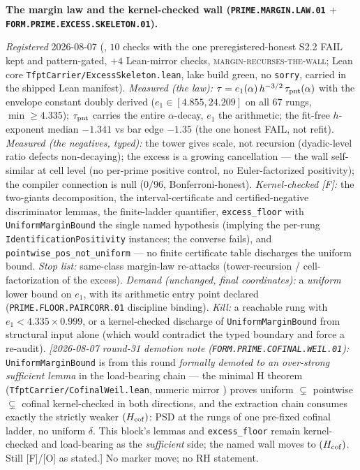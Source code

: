 \documentclass[11pt,a4paper]{article}
\begin{document}
\par\smallskip\noindent\textbf{The margin law and the
kernel-checked wall (\texttt{PRIME.MARGIN.LAW.01} $+$
\texttt{FORM.PRIME.\allowbreak EXCESS.\allowbreak SKELETON.01}).}
{\sloppy
\emph{Registered} 2026-08-07
(, $10$ checks with the
one preregistered-honest S2.2 FAIL kept and pattern-gated, $+4$
Lean-mirror checks, \textsc{margin-recurses-the-wall}; Lean core
\texttt{TfptCarrier/ExcessSkeleton.lean}, lake build green, no
\texttt{sorry}, carried in the shipped Lean manifest).
\emph{Measured (the law):} $\tau = e_1(\alpha)\, h^{-3/2}\,
\tau_{\rm pnt}(\alpha)$ with the envelope constant doubly
derived ($e_1 \in [4.855, 24.209]$ on all $67$ rungs,
$\min \ge 4.335$); $\tau_{\rm pnt}$ carries the entire
$\alpha$-decay, $e_1$ the arithmetic; the fit-free $h$-exponent
median $-1.341$ vs bar edge $-1.35$ (the one honest FAIL, not
refit).  \emph{Measured (the negatives, typed):} the tower gives
scale, not recursion (dyadic-level ratio defects non-decaying);
the excess is a growing cancellation --- the wall self-similar
at cell level (no per-prime positive control, no
Euler-factorized positivity); the compiler connection is null
($0/96$, Bonferroni-honest).  \emph{Kernel-checked [F]:} the
two-giants decomposition, the interval-certificate and
certified-negative discriminator lemmas, the finite-ladder
quantifier, \texttt{excess\_floor} with
\texttt{UniformMarginBound} the single named hypothesis
(implying the per-rung \texttt{IdentificationPositivity}
instances; the converse fails), and
\texttt{pointwise\_pos\_not\_uniform} --- no finite certificate
table discharges the uniform bound.  \emph{Stop list:}
same-class margin-law re-attacks (tower-recursion /
cell-factorization of the excess).  \emph{Demand (unchanged,
final coordinates):} a \emph{uniform} lower bound on $e_1$, with
its arithmetic entry point declared
(\texttt{PRIME.FLOOR.PAIRCORR.01} discipline binding).
\emph{Kill:} a reachable rung with $e_1 < 4.335 \times 0.999$,
or a kernel-checked discharge of \texttt{UniformMarginBound}
from structural input alone (which would contradict the typed
boundary and force a re-audit).
\emph{[2026-08-07 round-31 demotion note
(\texttt{FORM.PRIME.COFINAL.WEIL.01}):}
\texttt{UniformMarginBound} is from this round \emph{formally
demoted to an over-strong sufficient lemma} in the load-bearing
chain --- the minimal H theorem
(\texttt{TfptCarrier/CofinalWeil.lean}, numeric mirror
) proves uniform
$\subsetneq$ pointwise $\subsetneq$ cofinal kernel-checked in
both directions, and the extraction chain consumes exactly the
strictly weaker $(H_{\rm cof})$: PSD at the rungs of one
pre-fixed cofinal ladder, no uniform $\delta$.  This block's
lemmas and \texttt{excess\_floor} remain kernel-checked and
load-bearing as the \emph{sufficient} side; the named wall moves
to $(H_{\rm cof})$.  Still [F]/[O] as stated.]
No marker move; no RH
statement.\par}
\end{document}
